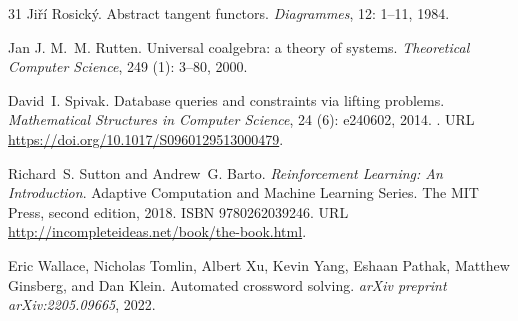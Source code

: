 \documentclass{article}
\begin{document}
\begin{thebibliography}{31}
Ji{\v r}{\'i} Rosick{\'y}.
\newblock Abstract tangent functors.
\newblock \emph{Diagrammes}, 12: 1--11, 1984.

Jan J. M.~M. Rutten.
\newblock Universal coalgebra: a theory of systems.
\newblock \emph{Theoretical Computer Science}, 249 (1): 3--80, 2000.

David~I. Spivak.
\newblock Database queries and constraints via lifting problems.
\newblock \emph{Mathematical Structures in Computer Science}, 24 (6): e240602, 2014.
\newblock {}.
\newblock URL \url{https://doi.org/10.1017/S0960129513000479}.

Richard~S. Sutton and Andrew~G. Barto.
\newblock \emph{Reinforcement Learning: An Introduction}.
\newblock Adaptive Computation and Machine Learning Series. The MIT Press, second edition, 2018.
\newblock ISBN 9780262039246.
\newblock URL \url{http://incompleteideas.net/book/the-book.html}.

Eric Wallace, Nicholas Tomlin, Albert Xu, Kevin Yang, Eshaan Pathak, Matthew Ginsberg, and Dan Klein.
\newblock Automated crossword solving.
\newblock \emph{arXiv preprint arXiv:2205.09665}, 2022.

\end{thebibliography}
\end{document}
